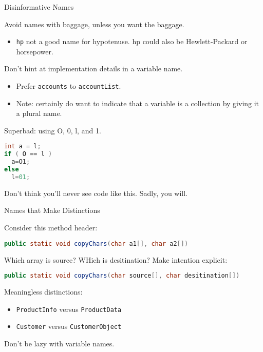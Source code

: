 \documentclass{beamer}
\begin{document}
\begin{frame}[fragile]{Disinformative Names}


Avoid names with baggage, unless you want the baggage.
\begin{itemize}
\item {\tt hp} not a good name for hypotenuse.  hp could also be Hewlett-Packard or horsepower.
\end{itemize}

Don't hint at implementation details in a variable name.
\begin{itemize}
\item Prefer {\tt accounts} to {\tt accountList}.
\item Note: certainly do want to indicate that a variable is a collection by giving it a plural name.
\end{itemize}

Superbad: using O, 0, l, and 1.
\begin{lstlisting}[language=Java]
int a = l;
if ( O == l )
  a=O1;
else
  l=01;
\end{lstlisting}
Don't think you'll never see code like this.  Sadly, you will.

\end{frame}

\begin{frame}[fragile]{Names that Make Distinctions}


Consider this method header:
\begin{lstlisting}[language=Java]
public static void copyChars(char a1[], char a2[])
\end{lstlisting}
Which array is source?  WHich is desitination?  Make intention explicit:
\begin{lstlisting}[language=Java]
public static void copyChars(char source[], char desitination[])
\end{lstlisting}

Meaningless distinctions:
\begin{itemize}
\item {\tt ProductInfo} versus {\tt ProductData}
\item {\tt Customer} versus {\tt CustomerObject}
\end{itemize}
Don't be lazy with variable names.

\end{frame}
\end{document}
